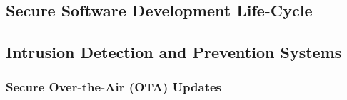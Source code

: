 \subsection{Secure Software Development Life-Cycle}\label{subsec:secure-software-development-life-cycle}
\subsection{Intrusion Detection and Prevention Systems}\label{subsec:intrusion-detection-and-prevention-systems}
\subsubsection{Secure Over-the-Air (OTA) Updates}\label{subsubsec:secure-over-the-air-ota-updates}

